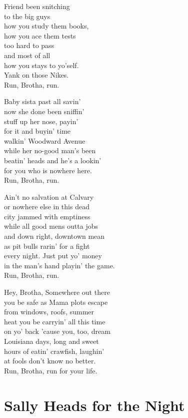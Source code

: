 \documentclass[twoside,10pt]{book}
\begin{document}
Friend been snitching\\
to the big guys\\
how you study them books,\\
how you ace them tests\\
too hard to pass\\
and most of all\\
how you stays to yo'self.\\
Yank on those Nikes.\\
Run, Brotha, run.

Baby sista past all savin'\\
now she done been sniffin'\\
stuff up her nose, payin'\\
for it and buyin' time\\
walkin' Woodward Avenue\\
while her no-good man's been\\
beatin' heads and he's a lookin'\\
for you who is nowhere here.\\
Run, Brotha, run.

Ain't no salvation at Calvary\\
or nowhere else in this dead\\
city jammed with emptiness\\
while all good mens outta jobs\\
and down right, downtown mean\\
as pit bulls rarin' for a fight\\
every night. Just put yo' money\\
in the man's hand playin' the game.\\
Run, Brotha, run.

Hey, Brotha, Somewhere out there\\
you be safe as Mama plots escape\\
from windows, roofs, summer\\
heat you be carryin' all this time\\
on yo' back 'cause you, too, dream\\
Louisiana days, long and sweet\\
hours of eatin' crawfish, laughin'\\
at fools don't know no better.\\
Run, Brotha, run for your life.


\clearpage
\section{Sally Heads for the Night}
\end{document}
